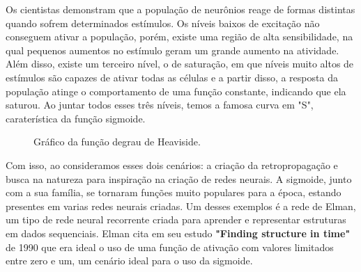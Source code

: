 Os cientistas demonstram que a população de neurônios reage de formas distintas quando sofrem determinados estímulos. Os níveis baixos de excitação não conseguem ativar a população, porém, existe uma região de alta sensibilidade, na qual pequenos aumentos no estímulo geram um grande aumento na atividade. Além disso, existe um terceiro nível, o de saturação, em que níveis muito altos de estímulos são capazes de ativar todas as células e a partir disso, a resposta da população atinge o comportamento de uma função constante, indicando que ela saturou. Ao juntar todos esses três níveis, temos a famosa curva em "S", caraterística da função sigmoide.

\begin{figure}[h!]
    \centering
    \caption{Gráfico da função degrau de Heaviside.}
    \label{fig:degrau-unitario}
\end{figure}

Com isso, ao consideramos esses dois cenários: a criação da retropropagação e busca na natureza para inspiração na criação de redes neurais. A sigmoide, junto com a sua família, se tornaram funções muito populares para a época, estando presentes em varias redes neurais criadas. Um desses exemplos é a rede de Elman, um tipo de rede neural recorrente criada para aprender e representar estruturas em dados sequenciais. Elman cita em seu estudo \textbf{"Finding structure in time"} de 1990 que era ideal o uso de uma função de ativação com valores limitados entre zero e um, um cenário ideal para o uso da sigmoide.

